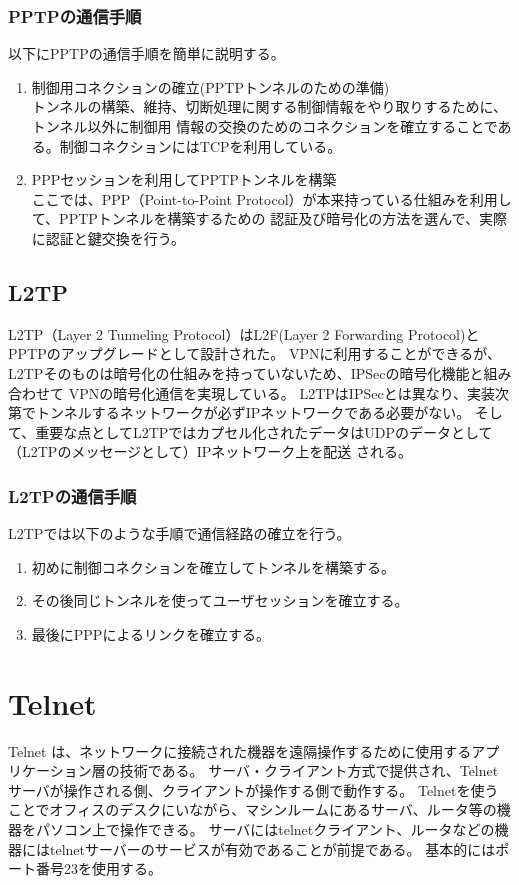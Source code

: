 \documentclass[11pt,a4j,titlepage]{jreport}
\begin{document}
\subsubsection*{PPTPの通信手順}
以下にPPTPの通信手順を簡単に説明する。
\begin{enumerate}
    \setlength{\parskip}{0.05cm} %
    \setlength{\itemsep}{0.05cm}
    \item 制御用コネクションの確立(PPTPトンネルのための準備)\mbox{}\\
    トンネルの構築、維持、切断処理に関する制御情報をやり取りするために、トンネル以外に制御用
    情報の交換のためのコネクションを確立することである。制御コネクションにはTCPを利用している。
    \item PPPセッションを利用してPPTPトンネルを構築\mbox{}\\
    ここでは、PPP（Point-to-Point Protocol）\cite{RFC1661}が本来持っている仕組みを利用して、PPTPトンネルを構築するための
    認証及び暗号化の方法を選んで、実際に認証と鍵交換を行う。
\end{enumerate}

\subsection{L2TP}
L2TP（Layer 2 Tunneling Protocol）\cite{RFC2661}はL2F(Layer 2 Forwarding Protocol)\cite{RFC2341}とPPTPのアップグレードとして設計された。
VPNに利用することができるが、L2TPそのものは暗号化の仕組みを持っていないため、IPSecの暗号化機能と組み合わせて
VPNの暗号化通信を実現している。
L2TPはIPSecとは異なり、実装次第でトンネルするネットワークが必ずIPネットワークである必要がない。
そして、重要な点としてL2TPではカプセル化されたデータはUDPのデータとして（L2TPのメッセージとして）IPネットワーク上を配送
される。
\subsubsection*{L2TPの通信手順}
L2TPでは以下のような手順で通信経路の確立を行う。
\begin{enumerate}
    \setlength{\parskip}{0.05cm} %
    \setlength{\itemsep}{0.05cm}
    \item 初めに制御コネクションを確立してトンネルを構築する。
    \item その後同じトンネルを使ってユーザセッションを確立する。
    \item 最後にPPPによるリンクを確立する。
\end{enumerate}


\section{Telnet}
Telnet \cite{RFC97}は、ネットワークに接続された機器を遠隔操作するために使用するアプリケーション層の技術である。
サーバ・クライアント方式で提供され、Telnetサーバが操作される側、クライアントが操作する側で動作する。
Telnetを使うことでオフィスのデスクにいながら、マシンルームにあるサーバ、ルータ等の機器をパソコン上で操作できる。
サーバにはtelnetクライアント、ルータなどの機器にはtelnetサーバーのサービスが有効であることが前提である。
基本的にはポート番号23を使用する。
\end{document}
